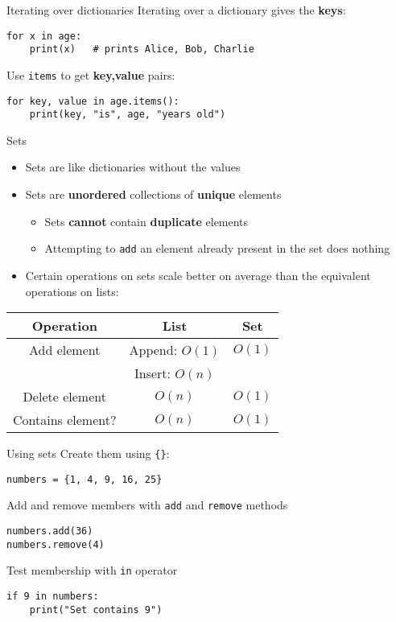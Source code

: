 \begin{frame}[fragile]{Iterating over dictionaries}
	\pause Iterating over a dictionary gives the \textbf{keys}:
	\begin{lstlisting}
for x in age:
    print(x)   # prints Alice, Bob, Charlie
	\end{lstlisting}
	\pause Use \lstinline{items} to get \textbf{key,value} pairs:
	\begin{lstlisting}
for key, value in age.items():
    print(key, "is", age, "years old")
	\end{lstlisting}
\end{frame}

\begin{frame}{Sets}
	\begin{itemize}
		\pause\item Sets are like dictionaries without the values
		\pause\item Sets are \textbf{unordered} collections of \textbf{unique} elements
            \begin{itemize}
                \pause\item Sets \textbf{cannot} contain \textbf{duplicate} elements
                \pause\item Attempting to \lstinline{add} an element already present in the set does nothing
            \end{itemize}
		\pause\item Certain operations on sets scale better on average than the equivalent operations on lists:
	\end{itemize}
	\pause
	\begin{center}
		\begin{tabular}{|c|c|c|}
			\hline
			\textbf{Operation} & \textbf{List} & \textbf{Set} \\\hline
			Add element & Append: $O(1)$ & $O(1)$ \\
			& Insert: $O(n)$ & \\\hline
			Delete element & $O(n)$ & $O(1)$ \\\hline
			Contains element? & $O(n)$ & $O(1)$ \\\hline
		\end{tabular}
	\end{center}
\end{frame}

\begin{frame}[fragile]{Using sets}
    \pause Create them using \lstinline|{}|:
	\begin{lstlisting}
numbers = {1, 4, 9, 16, 25}
	\end{lstlisting}
	\pause Add and remove members with \lstinline{add} and \lstinline{remove} methods
	\begin{lstlisting}
numbers.add(36)
numbers.remove(4)
	\end{lstlisting}
	\pause Test membership with \lstinline{in} operator
	\begin{lstlisting}
if 9 in numbers:
    print("Set contains 9")
	\end{lstlisting}
\end{frame}
